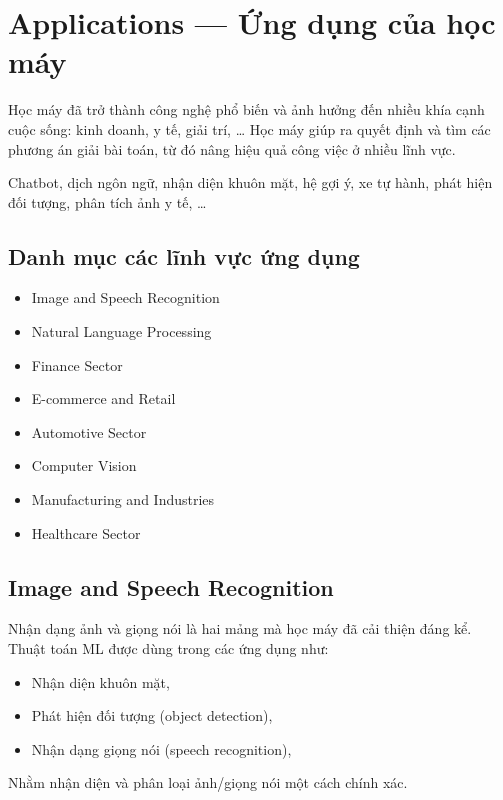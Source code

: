 \section{Applications --- Ứng dụng của học máy}

\begin{dongco}[title={Tổng quan}]
Học máy đã trở thành công nghệ phổ biến và ảnh hưởng đến nhiều khía cạnh cuộc sống: kinh doanh, y tế, giải trí, \ldots
Học máy giúp ra quyết định và tìm các phương án giải bài toán, từ đó nâng hiệu quả công việc ở nhiều lĩnh vực.
\end{dongco}

\begin{ynghia}[title={Một số ứng dụng thành công}]
Chatbot, dịch ngôn ngữ, nhận diện khuôn mặt, hệ gợi ý, xe tự hành, phát hiện đối tượng, phân tích ảnh y tế, \ldots
\end{ynghia}

\subsection{Danh mục các lĩnh vực ứng dụng}

\begin{phuongphap}[title={Các lĩnh vực}]
\begin{itemize}
  \item Image and Speech Recognition
  \item Natural Language Processing
  \item Finance Sector
  \item E-commerce and Retail
  \item Automotive Sector
  \item Computer Vision
  \item Manufacturing and Industries
  \item Healthcare Sector
\end{itemize}
\end{phuongphap}

\subsection{Image and Speech Recognition}

\begin{ynghia}[title={Nhận dạng ảnh và giọng nói}]
Nhận dạng ảnh và giọng nói là hai mảng mà học máy đã cải thiện đáng kể.
Thuật toán ML được dùng trong các ứng dụng như:
\begin{itemize}
  \item Nhận diện khuôn mặt,
  \item Phát hiện đối tượng (object detection),
  \item Nhận dạng giọng nói (speech recognition),
\end{itemize}
Nhằm nhận diện và phân loại ảnh/giọng nói một cách chính xác.
\end{ynghia}

